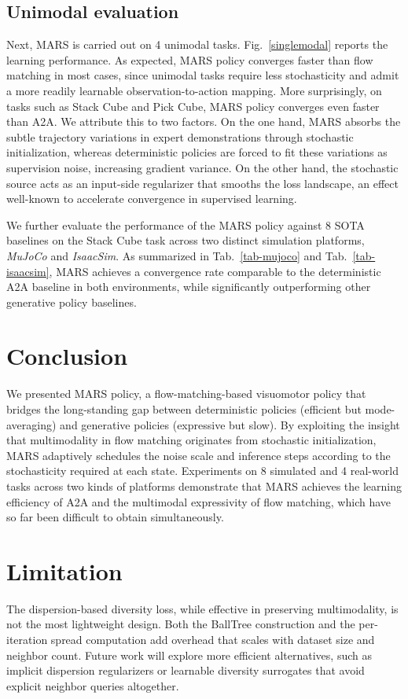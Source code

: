 \subsection{Unimodal evaluation}

Next, MARS is carried out on 4 unimodal tasks. Fig.~\ref{singlemodal} reports the learning performance. As expected, MARS policy converges faster than flow matching in most cases, since unimodal tasks require less stochasticity and admit a more readily learnable observation-to-action mapping. More surprisingly, on tasks such as {Stack Cube} and {Pick Cube}, MARS policy converges even faster than A2A. We attribute this to two factors. On the one hand, MARS absorbs the subtle trajectory variations in expert demonstrations through stochastic initialization, whereas deterministic policies are forced to fit these variations as supervision noise, increasing gradient variance. On the other hand, the stochastic source acts as an input-side regularizer that smooths the loss landscape, an effect well-known to accelerate convergence in supervised learning.

We further evaluate the performance of the MARS policy against 8 SOTA baselines on the {Stack Cube} task across two distinct simulation platforms, \textit{MuJoCo} and \textit{IsaacSim}. As summarized in Tab.~\ref{tab-mujoco} and Tab.~\ref{tab-isaacsim}, MARS achieves a convergence rate comparable to the deterministic A2A baseline in both environments, while significantly outperforming other generative policy baselines.


\section{Conclusion}

We presented MARS policy, a flow-matching-based visuomotor policy that bridges the long-standing gap between deterministic policies (efficient but mode-averaging) and generative policies (expressive but slow). By exploiting the insight that multimodality in flow matching originates from stochastic initialization, MARS adaptively schedules the noise scale and inference steps according to the stochasticity required at each state. Experiments on 8 simulated and 4 real-world tasks across two kinds of platforms demonstrate that MARS achieves the learning efficiency of A2A and the multimodal expressivity of flow matching, which have so far been difficult to obtain simultaneously.

\section{Limitation}
The dispersion-based diversity loss, while effective in preserving multimodality, is not the most lightweight design. Both the BallTree construction and the per-iteration spread computation add overhead that scales with dataset size and neighbor count. Future work will explore more efficient alternatives, such as implicit dispersion regularizers or learnable diversity surrogates that avoid explicit neighbor queries altogether.